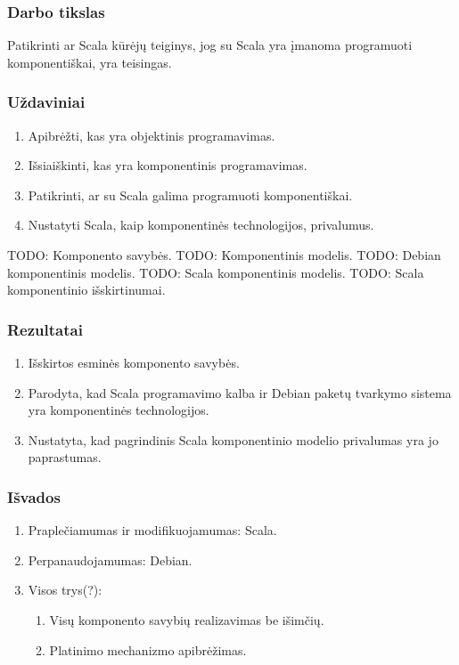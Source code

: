 \begin{frame}
  \frametitle{Darbo tikslas}
  Patikrinti ar Scala kūrėjų teiginys, jog su Scala yra įmanoma
  programuoti komponentiškai, yra teisingas.
\end{frame}

\begin{frame}
  \frametitle{Uždaviniai}
  \begin{enumerate}
    \item Apibrėžti, kas yra objektinis programavimas.
    \item Išsiaiškinti, kas yra komponentinis programavimas.
    \item Patikrinti, ar su Scala galima programuoti komponentiškai.
    \item Nustatyti Scala, kaip komponentinės technologijos, privalumus.
  \end{enumerate}
\end{frame}

TODO: Komponento savybės.
TODO: Komponentinis modelis.
TODO: Debian komponentinis modelis.
TODO: Scala komponentinis modelis.
TODO: Scala komponentinio išskirtinumai.

\begin{frame}
  \frametitle{Rezultatai}
  \begin{enumerate}
    \item Išskirtos esminės komponento savybės.
    \item Parodyta, kad Scala programavimo kalba ir Debian paketų
      tvarkymo sistema yra komponentinės technologijos.
    \item Nustatyta, kad pagrindinis Scala komponentinio modelio
      privalumas yra jo paprastumas.
  \end{enumerate}
\end{frame}

\begin{frame}
  \frametitle{Išvados}
  \begin{enumerate}
    \item Praplečiamumas ir modifikuojamumas: Scala.
    \item Perpanaudojamumas: Debian.
    \item Visos trys(?):
      \begin{enumerate}
        \item Visų komponento savybių realizavimas be išimčių.
        \item Platinimo mechanizmo apibrėžimas.
      \end{enumerate}
  \end{enumerate}
\end{frame}

